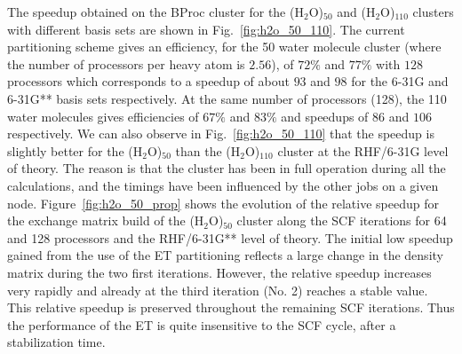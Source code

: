 \documentclass[prl,preprint,doublespace]{revtex4} %
\begin{document}
 The speedup obtained on the BProc cluster for the (H$_2$O)$_{50}$ 
 and (H$_2$O)$_{110}$ clusters 
 with different basis sets are shown in Fig.~\ref{fig:h2o_50_110}. 
 The current partitioning scheme
 gives an efficiency, for the 50 water molecule cluster 
 (where the number of processors per heavy atom is $2.56$), 
 of $72\%$ and $77\%$ with $128$ processors which 
 corresponds to a speedup of about $93$ and $98$ for 
 the 6-31G and 6-31G** basis sets respectively.  
 At the same number of processors (128), the 110 water molecules gives efficiencies of
 $67\%$ and $83\%$ and speedups of $86$ and $106$ respectively.
 We can also observe in Fig.~\ref{fig:h2o_50_110} that the speedup is slightly better
 for the (H$_2$O)$_{50}$ than the (H$_2$O)$_{110}$ cluster at the RHF/6-31G level of theory.
 The reason is that the cluster has been in full operation during all the calculations, 
 and the timings have been influenced by the other jobs on a given node.  
 Figure~\ref{fig:h2o_50_prop} shows the evolution of the relative speedup for
 the exchange matrix build of
 the (H$_2$O)$_{50}$ cluster along the SCF iterations for 
 64 and 128 processors and the RHF/6-31G** level of theory. 
 The initial low speedup gained from the use of the ET partitioning  
 reflects a large change in the density matrix during the two first 
 iterations. However, the relative speedup increases very 
 rapidly and already at the third iteration (No. 2) reaches a stable value.
 This relative speedup is preserved throughout the remaining SCF iterations.
 Thus the performance of the ET is quite insensitive to the SCF cycle, after
 a stabilization time.
\end{document}
